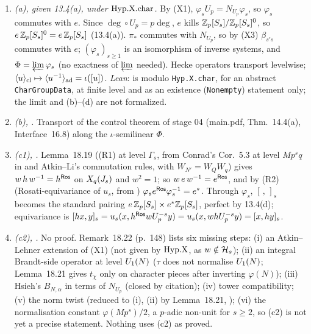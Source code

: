 \begin{outline}
\begin{enumerate}[label=(\arabic*)]
\item \emph{(a), \stproved{} given 13.4(a), under $\mathrm{Hyp.X.char}$.} By (X1), $\varphi_sU_p=N_{U_p}\varphi_s$, so $\varphi_s$ commutes with $e$.
  Since $\deg\circ U_p=p\deg$, $e$ kills $\mathbb{Z}_p[S_s]/\mathbb{Z}_p[S_s]^0$, so $e\,\mathbb{Z}_p[S_s]^0=e\,\mathbb{Z}_p[S_s]$ (13.4(a)). $\pi_*$ commutes with $N_{U_p}$,
  so by (X3) $\beta_{s's}$ commutes with $e$; $(\varphi_s)_{s\ge1}$ is an isomorphism of inverse systems, and $\Phi=\varprojlim\varphi_s$
  (no exactness of $\varprojlim$ needed). Hecke operators transport levelwise; $\langle u\rangle_{\rm cl}\mapsto\langle u^{-1}\rangle_{\rm ad}=\iota([u])$.
  \emph{Lean}:  is \stformal{} modulo \texttt{Hyp.X.char}, for an abstract
  \texttt{CharGroupData}, at finite level and as an existence (\texttt{Nonempty}) statement only; the limit and (b)--(d) are not formalized.
\item \emph{(b), \stpmc.} Transport of the control theorem of stage 04 (main.pdf, Thm.~14.4(a), Interface~16.8) along the
  $\iota$-semilinear $\Phi$.
\item \emph{(c1), \stpmc.} Lemma~18.19 ((R1) at level $\Gamma_s$, \stpmc{} from Conrad's Cor.~5.3 at level $Mp^sq$ in \cite{RS} and
  Atkin--Li's commutation rules, with $W_{N'}=W_QW_q$) gives $w\,h\,w^{-1}=h^{\mathsf{Ros}}$ on $X_q(J_s)$ and $w^2=1$; so $w\,e\,w^{-1}=e^{\mathsf{Ros}}$, and by (R2)
  (Rosati-equivariance of $u_s$, \stpmc{} from \cite[Exp.~IX, \S10.2, Thm.~10.4]{SGA7}) $\varphi_se^{\mathsf{Ros}}\varphi_s^{-1}=e^*$. Through $\varphi_s$,
  $[\,,\,]_s$ becomes the standard pairing $e\,\mathbb{Z}_p[S_s]\times e^*\mathbb{Z}_p[S_s]$, perfect by 13.4(d); equivariance is
  $[hx,y]_s=u_s(x,h^{\mathsf{Ros}} wU_p^{-s}y)=u_s(x,whU_p^{-s}y)=[x,hy]_s$.
\item \emph{(c2), \stopen.} No proof. \label{rpt:rem:s05-c2open}Remark~18.22 (p.~148) lists six missing steps: (i) an Atkin--Lehner extension of (X1) (not given
  by $\mathrm{Hyp.X}$, as $w\notin\mathcal{H}_s$); (ii) an integral Brandt-side operator at level $U_1(N)$ ($\tau$ does not normalise $U_1(N)$; Lemma~18.21
  gives $t_\chi$ only on character pieces after inverting $\varphi(N)$); (iii) Hsieh's $B_{N,\alpha}$ in terms of $N_{U_p}$ (closed by
  citation); (iv) tower compatibility; (v) the norm twist (reduced to (i), (ii) by Lemma~18.21, \stproved); (vi) the normalisation
  constant $\varphi(Mp^s)/2$, a $p$-adic non-unit for $s\ge2$, so (c2) is not yet a precise statement. Nothing uses (c2) as proved.

\end{enumerate}
\end{outline}
